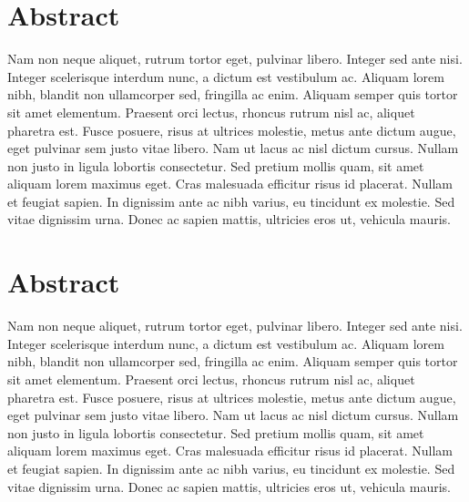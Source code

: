 \documentclass[
  12pt,
  a4paperpaper,
  a4paper]{scrreprt}
\begin{document}

\section*{\sffamily Abstract}
\normalsize{Nam non neque aliquet, rutrum tortor eget, pulvinar libero.
Integer sed ante nisi. Integer scelerisque interdum nunc, a dictum est
vestibulum ac. Aliquam lorem nibh, blandit non ullamcorper sed,
fringilla ac enim. Aliquam semper quis tortor sit amet elementum.
Praesent orci lectus, rhoncus rutrum nisl ac, aliquet pharetra est.
Fusce posuere, risus at ultrices molestie, metus ante dictum augue, eget
pulvinar sem justo vitae libero. Nam ut lacus ac nisl dictum cursus.
Nullam non justo in ligula lobortis consectetur. Sed pretium mollis
quam, sit amet aliquam lorem maximus eget. Cras malesuada efficitur
risus id placerat. Nullam et feugiat sapien. In dignissim ante ac nibh
varius, eu tincidunt ex molestie. Sed vitae dignissim urna. Donec ac
sapien mattis, ultricies eros ut, vehicula mauris.}
\vspace*{\baselineskip}
\clearpage


\section*{\sffamily Abstract}
\normalsize{Nam non neque aliquet, rutrum tortor eget, pulvinar libero.
Integer sed ante nisi. Integer scelerisque interdum nunc, a dictum est
vestibulum ac. Aliquam lorem nibh, blandit non ullamcorper sed,
fringilla ac enim. Aliquam semper quis tortor sit amet elementum.
Praesent orci lectus, rhoncus rutrum nisl ac, aliquet pharetra est.
Fusce posuere, risus at ultrices molestie, metus ante dictum augue, eget
pulvinar sem justo vitae libero. Nam ut lacus ac nisl dictum cursus.
Nullam non justo in ligula lobortis consectetur. Sed pretium mollis
quam, sit amet aliquam lorem maximus eget. Cras malesuada efficitur
risus id placerat. Nullam et feugiat sapien. In dignissim ante ac nibh
varius, eu tincidunt ex molestie. Sed vitae dignissim urna. Donec ac
sapien mattis, ultricies eros ut, vehicula mauris.}
\clearpage


\end{document}
